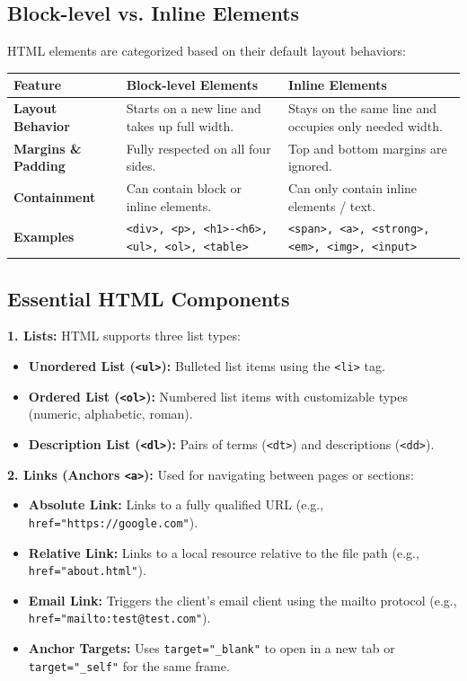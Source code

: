 \documentclass[12pt,a4paper]{article}
\renewcommand{\arraystretch}{1.45}
\begin{document}
\subsection{Block-level vs. Inline Elements}
HTML elements are categorized based on their default layout behaviors:

\par\noindent
{\renewcommand{\arraystretch}{1.5}%
\begin{tabularx}{\linewidth}{|B{3.2cm}|Y|Y|}
\hline
\textbf{Feature} & \textbf{Block-level Elements} & \textbf{Inline Elements} \\
\hline
\textbf{Layout Behavior} & Starts on a new line and takes up full width. & Stays on the same line and occupies only needed width. \\
\hline
\textbf{Margins \& Padding} & Fully respected on all four sides. & Top and bottom margins are ignored. \\
\hline
\textbf{Containment} & Can contain block or inline elements. & Can only contain inline elements / text. \\
\hline
\textbf{Examples} & \texttt{<div>, <p>, <h1>-<h6>, <ul>, <ol>, <table>} & \texttt{<span>, <a>, <strong>, <em>, <img>, <input>} \\
\hline
\end{tabularx}}

\subsection{Essential HTML Components}

\textbf{1. Lists:} HTML supports three list types:
\begin{itemize}[leftmargin=*, itemsep=3pt]
  \item \textbf{Unordered List (\texttt{<ul>}):} Bulleted list items using the \texttt{<li>} tag.
  \item \textbf{Ordered List (\texttt{<ol>}):} Numbered list items with customizable types (numeric, alphabetic, roman).
  \item \textbf{Description List (\texttt{<dl>}):} Pairs of terms (\texttt{<dt>}) and descriptions (\texttt{<dd>}).
\end{itemize}

\textbf{2. Links (Anchors \texttt{<a>}):} Used for navigating between pages or sections:
\begin{itemize}[leftmargin=*, itemsep=3pt]
  \item \textbf{Absolute Link:} Links to a fully qualified URL (e.g., \texttt{href="https://google.com"}).
  \item \textbf{Relative Link:} Links to a local resource relative to the file path (e.g., \texttt{href="about.html"}).
  \item \textbf{Email Link:} Triggers the client's email client using the mailto protocol (e.g., \texttt{href="mailto:test@test.com"}).
  \item \textbf{Anchor Targets:} Uses \texttt{target="\_blank"} to open in a new tab or \texttt{target="\_self"} for the same frame.
\end{itemize}
\end{document}

